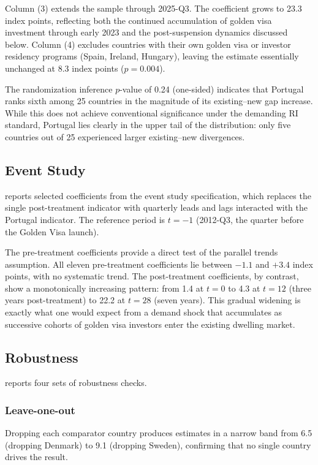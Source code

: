 \documentclass[12pt]{article}
\begin{document}
Column (3) extends the sample through 2025-Q3. The coefficient grows to 23.3 index points, reflecting both the continued accumulation of golden visa investment through early 2023 and the post-suspension dynamics discussed below. Column (4) excludes countries with their own golden visa or investor residency programs (Spain, Ireland, Hungary), leaving the estimate essentially unchanged at 8.3 index points ($p = 0.004$).

The randomization inference $p$-value of 0.24 (one-sided) indicates that Portugal ranks sixth among 25 countries in the magnitude of its existing--new gap increase. While this does not achieve conventional significance under the demanding RI standard, Portugal lies clearly in the upper tail of the distribution: only five countries out of 25 experienced larger existing--new divergences.

\subsection{Event Study}



 reports selected coefficients from the event study specification, which replaces the single post-treatment indicator with quarterly leads and lags interacted with the Portugal indicator. The reference period is $t = -1$ (2012-Q3, the quarter before the Golden Visa launch).

The pre-treatment coefficients provide a direct test of the parallel trends assumption. All eleven pre-treatment coefficients lie between $-1.1$ and $+3.4$ index points, with no systematic trend. The post-treatment coefficients, by contrast, show a monotonically increasing pattern: from 1.4 at $t = 0$ to 4.3 at $t = 12$ (three years post-treatment) to 22.2 at $t = 28$ (seven years). This gradual widening is exactly what one would expect from a demand shock that accumulates as successive cohorts of golden visa investors enter the existing dwelling market.

\subsection{Robustness}



 reports four sets of robustness checks.

\subsubsection*{Leave-one-out} Dropping each comparator country produces estimates in a narrow band from 6.5 (dropping Denmark) to 9.1 (dropping Sweden), confirming that no single country drives the result.
\end{document}
